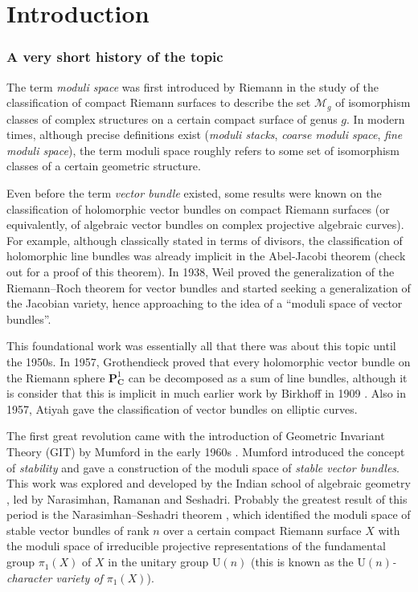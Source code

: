 \documentclass[12pt,a4paper]{book}
\theoremstyle{definition} \newtheorem{defn}[thm]{Definition}
\theoremstyle{definition} \newtheorem{ejemplo}[thm]{Example}
\theoremstyle{remark} \newtheorem{rem}[thm]{Remark}
\def\CC{\mathbf{C}}
\def\PP{\mathbf{P}}
\def\UU{\mathrm{U}}
\begin{document}
\newpage\null\thispagestyle{empty}

\chapter*{Introduction}
\subsection*{A very short history of the topic}

The term \textit{moduli space} was first introduced by Riemann in the study of the classification of compact Riemann surfaces to describe the set $\mathcal{M}_g$ of isomorphism classes of complex structures on a certain compact surface of genus $g$. In modern times, although precise definitions exist (\textit{moduli stacks}, \textit{coarse moduli space}, \textit{fine moduli space}), the term moduli space roughly refers to some set of isomorphism classes of a certain geometric structure.

Even before the term \textit{vector bundle} existed, some results were known on the classification of holomorphic vector bundles on compact Riemann surfaces (or equivalently, of algebraic vector bundles on complex projective algebraic curves). For example, although classically stated in terms of divisors, the classification of holomorphic line bundles was already implicit in the Abel-Jacobi theorem (check out \cite{griffithsharris} for a proof of this theorem). In 1938, Weil \cite{weil} proved the generalization of the Riemann--Roch theorem for vector bundles and started seeking a generalization of the Jacobian variety, hence approaching to the idea of a ``moduli space of vector bundles''. 

This foundational work was essentially all that there was about this topic until the 1950s. In 1957, Grothendieck \cite{grothendieck} proved that every holomorphic vector bundle on the Riemann sphere $\PP^1_\CC$ can be decomposed as a sum of line bundles, although it is consider that this is implicit in much earlier work by Birkhoff in 1909 \cite{birkhoff}. Also in 1957, Atiyah \cite{atiyahelliptic} gave the classification of vector bundles on elliptic curves.

The first great revolution came with the introduction of Geometric Invariant Theory (GIT) by Mumford in the early 1960s \cite{git}. Mumford introduced the concept of \textit{stability} and gave a construction of the moduli space of \textit{stable vector bundles}. This work was explored and developed by the Indian school of algebraic geometry \cite{narasimhan}, led by  Narasimhan, Ramanan and Seshadri. Probably the greatest result of this period is the Narasimhan--Seshadri theorem \cite{narasimhanseshadri}, which identified the moduli space of stable vector bundles of rank $n$ over a certain compact Riemann surface $X$ with the moduli space of irreducible projective representations of the fundamental group $\pi_1(X)$ of $X$ in the unitary group $\UU(n)$ (this is known as the \textit{$\UU(n)$-character variety of $\pi_1(X)$}).
\end{document}
